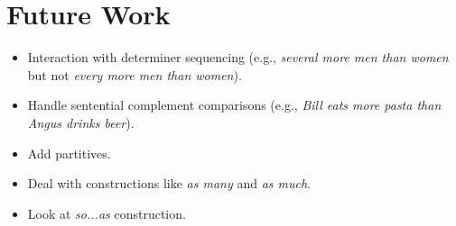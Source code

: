 \section{Future Work} 
 
\begin{itemize} 
\item Interaction with determiner sequencing (e.g., {\it several more men than women} but not {\it *every more men than women}). 
 
\item Handle sentential complement comparisons (e.g., {\it Bill eats more pasta than Angus drinks beer}). 
 
\item Add partitives. 
 
\item Deal with constructions like {\it as many} and {\it as much}. 
 
\item Look at {\it so...as} construction. 
 
\end{itemize} 
 
 
 
 
